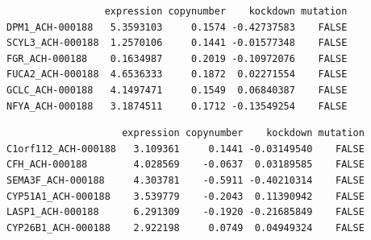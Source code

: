 \documentclass[]{article}
\newenvironment{Shaded}{\begin{snugshade}}{\end{snugshade}}
\newcommand{\KeywordTok}[1]{\textcolor[rgb]{0.13,0.29,0.53}{\textbf{#1}}}
\newcommand{\DataTypeTok}[1]{\textcolor[rgb]{0.13,0.29,0.53}{#1}}
\newcommand{\DecValTok}[1]{\textcolor[rgb]{0.00,0.00,0.81}{#1}}
\newcommand{\StringTok}[1]{\textcolor[rgb]{0.31,0.60,0.02}{#1}}
\newcommand{\CommentTok}[1]{\textcolor[rgb]{0.56,0.35,0.01}{\textit{#1}}}
\newcommand{\OtherTok}[1]{\textcolor[rgb]{0.56,0.35,0.01}{#1}}
\newcommand{\OperatorTok}[1]{\textcolor[rgb]{0.81,0.36,0.00}{\textbf{#1}}}
\newcommand{\NormalTok}[1]{#1}
\begin{document}
\begin{Shaded}
\end{Shaded}

\begin{verbatim}
                 expression copynumber    kockdown mutation
DPM1_ACH-000188   5.3593103     0.1574 -0.42737583    FALSE
SCYL3_ACH-000188  1.2570106     0.1441 -0.01577348    FALSE
FGR_ACH-000188    0.1634987     0.2019 -0.10972076    FALSE
FUCA2_ACH-000188  4.6536333     0.1872  0.02271554    FALSE
GCLC_ACH-000188   4.1497471     0.1549  0.06840387    FALSE
NFYA_ACH-000188   3.1874511     0.1712 -0.13549254    FALSE
\end{verbatim}

\begin{Shaded}
\end{Shaded}

\begin{verbatim}
                    expression copynumber    kockdown mutation
C1orf112_ACH-000188   3.109361     0.1441 -0.03149540    FALSE
CFH_ACH-000188        4.028569    -0.0637  0.03189585    FALSE
SEMA3F_ACH-000188     4.303781    -0.5911 -0.40210314    FALSE
CYP51A1_ACH-000188    3.539779    -0.2043  0.11390942    FALSE
LASP1_ACH-000188      6.291309    -0.1920 -0.21685849    FALSE
CYP26B1_ACH-000188    2.922198     0.0749  0.04949324    FALSE
\end{verbatim}
\end{document}
